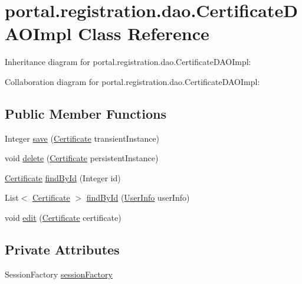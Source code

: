 \hypertarget{classportal_1_1registration_1_1dao_1_1CertificateDAOImpl}{
\section{portal.registration.dao.CertificateDAOImpl Class Reference}
\label{classportal_1_1registration_1_1dao_1_1CertificateDAOImpl}
}


Inheritance diagram for portal.registration.dao.CertificateDAOImpl:


Collaboration diagram for portal.registration.dao.CertificateDAOImpl:
\subsection*{Public Member Functions}
\begin{DoxyCompactItemize}
\item 
Integer \hyperlink{classportal_1_1registration_1_1dao_1_1CertificateDAOImpl_a6131a112c85bb539f61dc079d8afcbbb}{save} (\hyperlink{classportal_1_1registration_1_1domain_1_1Certificate}{Certificate} transientInstance)
\item 
void \hyperlink{classportal_1_1registration_1_1dao_1_1CertificateDAOImpl_a46214fc34d32586747e7d9b7ff0a735d}{delete} (\hyperlink{classportal_1_1registration_1_1domain_1_1Certificate}{Certificate} persistentInstance)
\item 
\hyperlink{classportal_1_1registration_1_1domain_1_1Certificate}{Certificate} \hyperlink{classportal_1_1registration_1_1dao_1_1CertificateDAOImpl_aed1fed865abe0006ad14bdf5dffe2932}{findById} (Integer id)
\item 
List$<$ \hyperlink{classportal_1_1registration_1_1domain_1_1Certificate}{Certificate} $>$ \hyperlink{classportal_1_1registration_1_1dao_1_1CertificateDAOImpl_a3e023e8f1bb0aed1b21dc556f148a640}{findById} (\hyperlink{classportal_1_1registration_1_1domain_1_1UserInfo}{UserInfo} userInfo)
\item 
void \hyperlink{classportal_1_1registration_1_1dao_1_1CertificateDAOImpl_a4baa20618a158327206b303a62b469e7}{edit} (\hyperlink{classportal_1_1registration_1_1domain_1_1Certificate}{Certificate} certificate)
\end{DoxyCompactItemize}
\subsection*{Private Attributes}
\begin{DoxyCompactItemize}
\item 
SessionFactory \hyperlink{classportal_1_1registration_1_1dao_1_1CertificateDAOImpl_a14bdf753d92377fe970839b6f362ef4f}{sessionFactory}
\end{DoxyCompactItemize}
